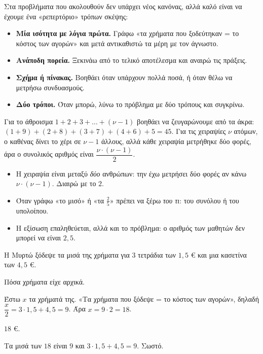 Στα προβλήματα που ακολουθούν δεν υπάρχει νέος κανόνας, αλλά καλό είναι να έχουμε ένα «ρεπερτόριο» τρόπων σκέψης:
\begin{itemize}[leftmargin=1.2em,itemsep=0.3ex,topsep=2pt]
\item \textbf{Μία ισότητα με λόγια πρώτα.} Γράφω «τα χρήματα που ξοδεύτηκαν = το κόστος των αγορών» και μετά αντικαθιστώ τα μέρη με τον άγνωστο.
\item \textbf{Ανάποδη πορεία.} Ξεκινάω από το τελικό αποτέλεσμα και αναιρώ τις πράξεις.
\item \textbf{Σχήμα ή πίνακας.} Βοηθάει όταν υπάρχουν πολλά ποσά, ή όταν θέλω να μετρήσω συνδυασμούς.
\item \textbf{Δύο τρόποι.} Όταν μπορώ, λύνω το πρόβλημα με δύο τρόπους και συγκρίνω.
\end{itemize}
Για το άθροισμα $1+2+3+\dots+(\nu-1)$ βοηθάει να ζευγαρώνουμε από τα άκρα: $(1+9)+(2+8)+(3+7)+(4+6)+5=45$. Για τις χειραψίες $\nu$ ατόμων, ο καθένας δίνει το χέρι σε $\nu-1$ άλλους, αλλά κάθε χειραψία μετρήθηκε δύο φορές, άρα ο συνολικός αριθμός είναι $\dfrac{\nu\cdot(\nu-1)}{2}$.

\begin{prosoxi}
\begin{itemize}[leftmargin=1.2em,itemsep=0.3ex,topsep=2pt]
\item Η χειραψία είναι μεταξύ \emph{δύο} ανθρώπων: την έχω μετρήσει δύο φορές αν κάνω $\nu\cdot(\nu-1)$. Διαιρώ με το $2$.
\item Όταν γράφω «το μισό» ή «τα $\frac{2}{5}$» πρέπει να ξέρω \emph{του τι}: του συνόλου ή του υπολοίπου.
\item Η εξίσωση επαληθεύεται, αλλά και το πρόβλημα: ο αριθμός των μαθητών δεν μπορεί να είναι $2{,}5$.
\end{itemize}
\end{prosoxi}


\tixero Η Μυρτώ ξόδεψε τα μισά της χρήματα για $3$ τετράδια των $1{,}5$ € και μια κασετίνα των $4{,}5$ €.\par
\tithelo Πόσα χρήματα είχε αρχικά.\par
\possindeo Έστω $x$ τα χρήματά της. «Τα χρήματα που ξόδεψε = το κόστος των αγορών», δηλαδή $\dfrac{x}{2}=3\cdot1{,}5+4{,}5=9$. Άρα $x=9\cdot2=18$.\par
\apantisi $18$ €.\par
\elegxos Τα μισά των $18$ είναι $9$ και $3\cdot1{,}5+4{,}5=9$. Σωστό.

